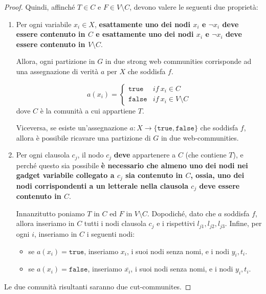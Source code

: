 \begin{proof}
    Quindi, affinché $T \in C$ e $F \in V \setminus C$, devono valere le seguenti due proprietà:
    \begin{enumerate}
        \item Per ogni variabile $x_i \in X$, \textbf{esattamente uno dei nodi $x_i$ e $\lnot x_i$ deve essere contenuto in $C$ e esattamente uno dei nodi $x_i$ e $\lnot x_i$ deve essere contenuto in $V \setminus C$}. 
        
        Allora, ogni partizione in $G$ in due strong web communities corrisponde ad una assegnazione di verità $a$ per $X$ che soddisfa $f$. 

        \[
            a(x_i) = 
            \begin{cases}
                \texttt{true}& if\  x_i \in C\\
                \texttt{false} & if\ x_i \in V \setminus C
            \end{cases}
        \]
        dove $C$ è la comunità a cui appartiene $T$.
        
        Viceversa, se esiste un'assegnazione $a: X \rightarrow \lbrace \texttt{true}, \texttt{false} \rbrace$ che soddisfa $f$, allora è possibile ricavare una partizione di $G$ in due web-communities.

        \item Per ogni clausola $c_j$, il nodo $c_j$ \textbf{deve} appartenere a $C$ (che contiene $T$), e perché questo sia possibile \textbf{è necessario che almeno uno dei nodi nei gadget variabile collegato a $c_j$ sia contenuto in $C$, ossia, uno dei nodi corrispondenti a un letterale nella clausola $c_j$ deve essere contenuto in $C$}.

        Innanzitutto poniamo $T$ in $C$ ed $F$ in $V \setminus C$. Dopodiché, dato che $a$ soddisfa $f$, allora inseriamo in $C$ tutti i nodi clausola $c_j$ e i rispettivi $l_{j1}, l_{j2}, l_{j3}$. Infine, per ogni $i$, inseriamo in $C$ i seguenti nodi:
        \begin{itemize}
            \item  se $a(x_i) = \texttt{true}$, inseriamo $x_i$, i suoi nodi senza nomi, e i nodi $y_i, t_i$.
            \item se $a(x_i) = \texttt{false}$, inseriamo $\overline{x_i}$, i suoi nodi senza nomi, e i nodi $y_i, t_i$.
        \end{itemize}
    \end{enumerate}
        
    Le due comunità risultanti saranno due cut-communites.
\end{proof}

